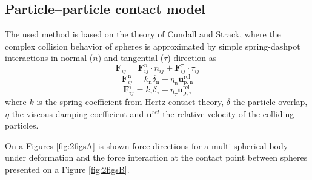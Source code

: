 \subsection{Particle–particle contact model}

The used method is based on the theory of Cundall and Strack\cite{cundall1979discrete}, where the complex collision behavior of spheres is approximated by simple spring-dashpot interactions in normal ($n$) and tangential ($\tau$) direction as
\begin{equation}
\boldsymbol{F}_{i j}=\boldsymbol{F}_{i j}^{n} \cdot n_{i j}+\boldsymbol{F}_{i j}^{\tau} \cdot \tau_{i j}
\end{equation}
\begin{equation}
    \boldsymbol{F}^{\mathrm{n}}_{ij}=k_{\mathrm{n}} \delta_{\mathrm{n}}-\eta_{\mathrm{n}} \boldsymbol{u}_{\mathrm{p}, \mathrm{n}}^{\mathrm{rel}}
\end{equation}
\begin{equation}
    \boldsymbol{F}^{\tau}_{ij}=k_{\tau} \delta_{\tau}-\eta_{\tau} \boldsymbol{u}_{\mathrm{p},{\tau}}^{\mathrm{rel}}
\end{equation}
where $k$ is the spring coefficient from Hertz contact theory, $\delta$ the particle overlap, $\eta$ the viscous damping coefficient and $\mathbf{u}^{rel}$ the relative velocity of the colliding particles.

On a Figures \ref{fig:2figsA} is shown force directions for a multi-spherical body under deformation and the force interaction at the contact point between spheres presented on a Figure \ref{fig:2figsB}.


